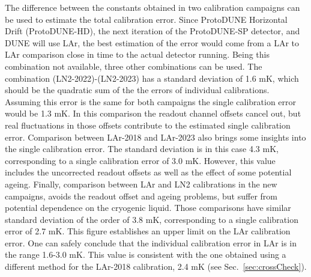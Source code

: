 \noindent The difference between the constants obtained in two calibration campaigns can be used to estimate the total calibration error. Since ProtoDUNE Horizontal Drift (ProtoDUNE-HD), the next iteration of the ProtoDUNE-SP detector, and DUNE will use LAr, the best estimation of the error would come from a LAr to LAr comparison close in time to the actual detector running. Being this combination not available, three other combinations can be used. The combination (LN2-2022)-(LN2-2023) has a standard deviation of 1.6 mK, which should be the quadratic sum of the the errors of individual calibrations. Assuming this error is the same for both campaigns the single calibration error would be 1.3 mK. In this comparison the readout channel offsets cancel out, but real fluctuations in those offsets contribute to the estimated single calibration error. Comparison between LAr-2018 and LAr-2023 also brings some insights into the single calibration error. The standard deviation is in this case 4.3 mK, corresponding to a single calibration error of 3.0 mK. However, this value includes the uncorrected readout offsets as well as the effect of some potential ageing. Finally, comparison between LAr and LN2 calibrations in the new campaigns, avoids the readout offset and ageing problems, but suffer from potential dependence on the cryogenic liquid. Those comparisons have similar standard deviation of the order of 3.8 mK, corresponding to a single calibration error of 2.7 mK. This figure establishes an upper limit on the LAr calibration error. One can safely conclude that the individual calibration error in LAr is in the range 1.6-3.0 mK. This value is consistent with the one obtained using a different method for the LAr-2018 calibration, 2.4 mK (see Sec.~\ref{sec:crossCheck}).